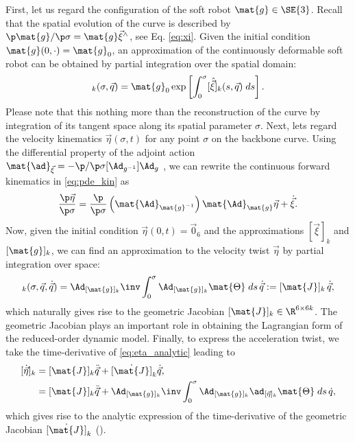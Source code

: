 First, let us regard the configuration of the soft robot $\mat{g} \in \SE{3}$. Recall that the spatial evolution of the curve is described by $\p \mat{g}/\p\sigma = \mat{g} \vec{\xi}^\wedge$, see Eq. \eqref{eq:xi}. Given the initial condition $\mat{g}(0,\cdot) = \mat{g}_0$, an approximation of the continuously deformable soft robot can be obtained by partial integration over the spatial domain:
%
\begin{equation}
[\mat{g}]_k(\sigma,\vec{q}) = \mat{g}_0 \exp\left[\int_0^\sigma [\hat{\vec{\xi}}]_k(s,\vec{q}) \; ds \right].
\end{equation}
%
Please note that this nothing more than the reconstruction of the curve by integration of its tangent space along its spatial parameter $\sigma$. Next, lets regard the velocity kinematics $\vec{\eta}(\sigma,t)$ for any point $\sigma$ on the backbone curve. Using the differential property of the adjoint action $\mat{\ad}_{\vec{\xi}} = -\p /\p \sigma [\Ad_{g^{-1}}] \Ad_{g}$ \cite{Murray1994}, we can rewrite the continuous forward kinematics in \eqref{eq:pde_kin} as
%
\begin{equation}
\frac{\p \vec{\eta}}{\p \sigma } = \frac{\p }{\p \sigma }\left(\mat{\Ad}_{\mat{g}^{-1}}\right) \mat{\Ad}_{\mat{g}} \vec{\eta} + \dot{\vec{\xi}}. \label{eq:eta_adg}
\end{equation}
%
Now, given the initial condition $\vec{\eta}(0,t) = \vec{0}_6$ and the approximations $[\vec{\xi}]_k$ and $[\mat{g}]_k$, we can find an approximation to the velocity twist $\vec{\eta}$ by partial integration over space:
%
\begin{equation}
[\vec{\eta}]_k(\sigma,\vec{q},\dot{\vec{q}}) = \Ad_{[\mat{g}]_k}\inv \int_0^\sigma \Ad_{[\mat{g}]_k} \mat{\Theta} \; ds \,\dot{\vec{q}} := [\mat{J}]_k\, \dot{\vec{q}}, \label{eq:eta_analytic}
\end{equation}
%
which naturally gives rise to the geometric Jacobian $[\mat{J}]_k \in \R^{6\times 6k}$. The geometric Jacobian plays an important role in obtaining the Lagrangian form of the reduced-order dynamic model. Finally, to express the acceleration twist, we take the time-derivative of \eqref{eq:eta_analytic} leading to
%
\begin{align}{}
[\dot{\vec{\eta}}]_k & = [\mat{J}]_k\ddot{\vec{q}} + \dot{[\mat{J}]}_k\dot{\vec{q}}, \notag \\
& = [\mat{J}]_k\ddot{\vec{q}} + \Ad_{[\mat{g}]_k}\inv \int_0^\sigma \Ad_{[\mat{g}]_k} \ad_{[\vec{\eta}]_k} \mat{\Theta} \; ds \,\dot{q} \label{eq:deta_analytic},
\end{align}
%
which gives rise to the analytic expression of the time-derivative of the geometric Jacobian $\dot{[\mat{J}]}_k$ ().

